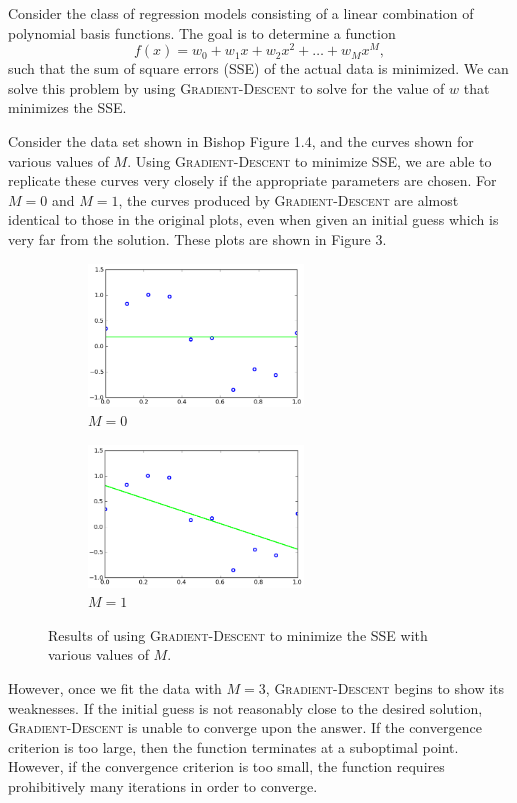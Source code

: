 \documentclass{sigchi}
\begin{document}
Consider the class of regression models consisting of a linear combination of polynomial basis functions. The goal is to determine a function
\[f(x) = w_0 + w_1x + w_2x^2 + \hdots + w_Mx^M,\]
such that the sum of square errors (SSE) of the actual data is minimized. We can solve this problem by using \textsc{Gradient-Descent} to solve for the value of $w$ that minimizes the SSE.

Consider the data set shown in Bishop Figure 1.4, and the curves shown for various values of $M$. Using \textsc{Gradient-Descent} to minimize SSE, we are able to replicate these curves very closely if the appropriate parameters are chosen. For $M = 0$ and $M = 1$, the curves produced by \textsc{Gradient-Descent} are almost identical to those in the original plots, even when given an initial guess which is very far from the solution. These plots are shown in Figure 3.

\begin{figure}[!t]
\centering
\begin{subfigure}[b]{2.25in}
	\includegraphics[width = 2.25in]{m0.png}
	\caption{$M = 0$}
\end{subfigure}
\begin{subfigure}[b]{2.25in}
	\includegraphics[width = 2.25in]{m1.png}
	\caption{$M = 1$}
\end{subfigure}
\caption{Results of using \textsc{Gradient-Descent} to minimize the SSE with various values of $M$.}
\end{figure}

However, once we fit the data with $M = 3$, \textsc{Gradient-Descent} begins to show its weaknesses. If the initial guess is not reasonably close to the desired solution, \textsc{Gradient-Descent} is unable to converge upon the answer. If the convergence criterion is too large, then the function terminates at a suboptimal point. However, if the convergence criterion is too small, the function requires prohibitively many iterations in order to converge.
\end{document}

